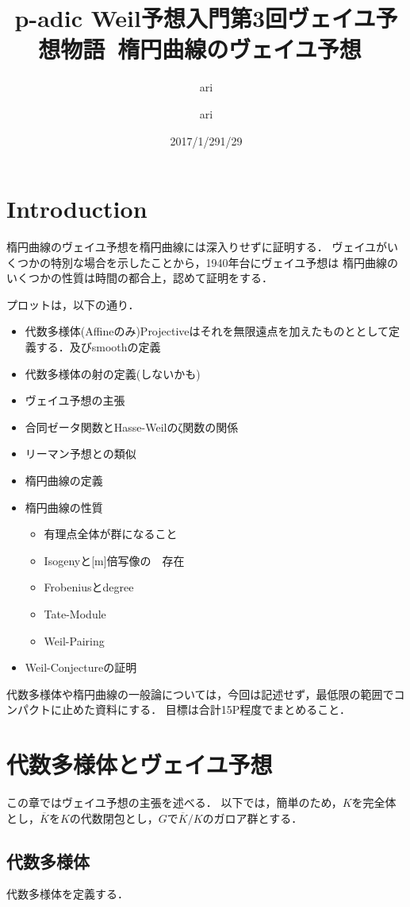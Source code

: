 \documentclass{ujarticle}
\author{ari}
\title{p-adic Weil予想入門}
\date{2017/1/29}
\title{第3回ヴェイユ予想物語~楕円曲線のヴェイユ予想~}
\author{ari}
\date{1/29}
\begin{document}
\maketitle
\tableofcontents

\section{Introduction}
\label{sec:Introduction}
楕円曲線のヴェイユ予想を楕円曲線には深入りせずに証明する．
ヴェイユがいくつかの特別な場合を示したことから，1940年台にヴェイユ予想は
楕円曲線のいくつかの性質は時間の都合上，認めて証明をする．

プロットは，以下の通り．

\begin{itemize}
  \item 代数多様体(Affineのみ)Projectiveはそれを無限遠点を加えたものととして定義する．及びsmoothの定義
  \item 代数多様体の射の定義(しないかも)
  \item ヴェイユ予想の主張
  \item 合同ゼータ関数とHasse-Weilのζ関数の関係
  \item リーマン予想との類似
  \item 楕円曲線の定義
  \item 楕円曲線の性質
  \begin{itemize}
    \item 有理点全体が群になること
    \item Isogenyと[m]倍写像の　存在
    \item Frobeniusとdegree
    \item Tate-Module
    \item Weil-Pairing
  \end{itemize}
  \item Weil-Conjectureの証明
\end{itemize}
代数多様体や楕円曲線の一般論については，今回は記述せず，最低限の範囲でコンパクトに止めた資料にする．
目標は合計15P程度でまとめること．

\section{代数多様体とヴェイユ予想}
\label{sec:代数多様体とヴェイユ予想}
この章ではヴェイユ予想の主張を述べる．
以下では，簡単のため，$K$を完全体とし，$\overline{K}$を$K$の代数閉包とし，$G$で$\overline{K}/K$のガロア群とする．

\subsection{代数多様体}
\label{sub:代数多様体}
代数多様体を定義する．
\end{document}
